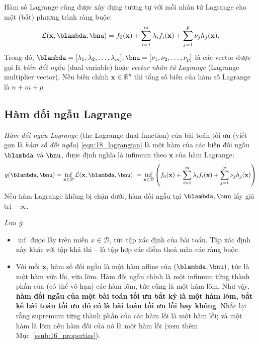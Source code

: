 Hàm số Lagrange cũng được xây dựng tương tự với mỗi nhân tử Lagrange cho một (bất) phương trình ràng buộc: 
\begin{equation*} 
\mathcal{L}(\mathbf{x}, \blambda, \bnu) = f_0(\mathbf{x}) + \sum_{i=1}^m \lambda_if_i(\mathbf{x}) + \sum_{j=1}^p \nu_j h_j(\mathbf{x}). 
\end{equation*} 
Trong đó, $\blambda = [\lambda_1, \lambda_2, \dots, \lambda_m]; \bnu = [\nu_1, \nu_2,
\dots, \nu_p]$ là các vector được gọi là \textit{biến đối ngẫu}
({dual variable}) hoặc \textit{vector nhân tử Lagrange}
({Lagrange multiplier vector}). Nếu biến chính $\mathbf{x} \in  
\mathbb{R}^n$ thì tổng số biến của hàm số Lagrange là $n + m + p$.
 
 
\subsection{Hàm đối ngẫu Lagrange }
\textit{Hàm đối ngẫu Lagrange} ({the Lagrange dual function}) của bài toán
tối ưu (viết gọn là \textit{hàm số đối ngẫu}) \eqref{eqn:18_lagrangian} là một
hàm của các biến đối ngẫu $\blambda$ và $\bnu$, được định nghĩa là infimum theo $\mathbf{x}$
của hàm Lagrange:
\begin{equation} 
g(\blambda, \bnu) = \inf_{\mathbf{x} \in \mathcal{D}} \mathcal{L}(\mathbf{x},
\blambda, \bnu)\\\ 
= \inf_{\mathbf{x} \in \mathcal{D}}\left( f_0(\mathbf{x}) + \sum_{i=1}^m \lambda_if_i(\mathbf{x}) + \sum_{j=1}^p \nu_j h_j(\mathbf{x})\right) 
\end{equation} 
Nếu hàm Lagrange không bị chặn dưới, hàm đối ngẫu tại $\blambda, \bnu$ lấy giá trị $-\infty$.
 
\textit{Lưu ý}:
\begin{itemize}
    \item $\inf$ được lấy trên miền $x \in \mathcal{D}$, tức tập xác định của
    bài toán. Tập xác
    định này khác với tập khả thi  --  là tập hợp các điểm thoả mãn các
    ràng buộc. 

    \item Với mỗi $\mathbf{x}$, hàm số đối ngẫu là một hàm {affine}
    của $(\blambda, \bnu)$, tức là một hàm vừa lồi, vừa lõm. {Hàm
    đối ngẫu} chính là một {infimum} từng thành phần của (có thể vô hạn) các hàm
    lõm, tức cũng là một hàm lõm. Như vậy, \textbf{hàm đối ngẫu của một bài toán
    tối ưu bất kỳ là một hàm lõm, bất kể bài toán tối ưu đó có là bài toán tối ưu lồi hay không}. Nhắc lại rằng {supremum} từng thành phần của các hàm
    lồi là một hàm lồi; và một hàm là lõm nếu hàm đối của nó là một hàm lồi (xem thêm
    Mục~\ref{ssub:16_properties}).
\end{itemize}
 
